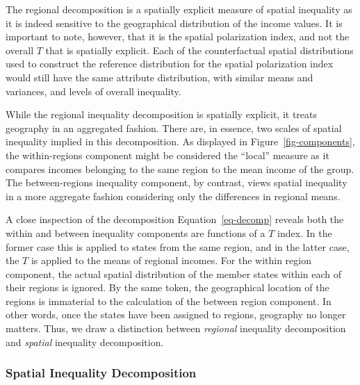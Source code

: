 \documentclass[
  a4paper, 
  twoside,
  final
]{article}
\begin{document}
The regional decomposition is a spatially explicit measure of spatial
inequality as it is indeed sensitive to the geographical distribution of
the income values. It is important to note, however, that it is the
spatial polarization index, and not the overall \(T\) that is spatially
explicit. Each of the counterfactual spatial distributions used to
construct the reference distribution for the spatial polarization index
would still have the same attribute distribution, with similar means and
variances, and levels of overall inequality.

While the regional inequality decomposition is spatially explicit, it
treats geography in an aggregated fashion. There are, in essence, two
scales of spatial inequality implied in this decomposition. As displayed
in Figure~\ref{fig-components}, the within-regions component might be
considered the ``local'' measure as it compares incomes belonging to the
same region to the mean income of the group. The between-regions
inequality component, by contrast, views spatial inequality in a more
aggregate fashion considering only the differences in regional means.

A close inspection of the decomposition Equation~\ref{eq-decomp} reveals
both the within and between inequality components are functions of a
\(T\) index. In the former case this is applied to states from the same
region, and in the latter case, the \(T\) is applied to the means of
regional incomes. For the within region component, the actual spatial
distribution of the member states within each of their regions is
ignored. By the same token, the geographical location of the regions is
immaterial to the calculation of the between region component. In other
words, once the states have been assigned to regions, geography no
longer matters. Thus, we draw a distinction between \emph{regional}
inequality decomposition and \emph{spatial} inequality decomposition.

\subsubsection{Spatial Inequality
Decomposition}\label{spatial-inequality-decomposition}
\end{document}

